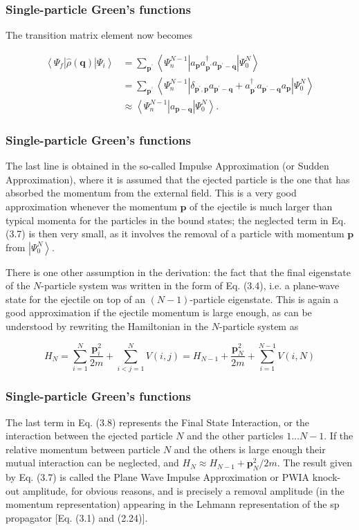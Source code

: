 \documentclass[compress]{beamer}
\begin{document}
\frame
{
\frametitle{Single-particle Green's functions}
\begin{small}
{\scriptsize
The transition matrix element now becomes

$$
\begin{aligned}
\left\langle\Psi_{f}|\hat{\rho}(\boldsymbol{q})| \Psi_{i}\right\rangle & =\sum_{\boldsymbol{p}^{\prime}}\left\langle\Psi_{n}^{N-1}\left|a_{\boldsymbol{p}} a_{\boldsymbol{p}^{\prime}}^{\dagger} a_{\boldsymbol{p}^{\prime}-\boldsymbol{q}}\right| \Psi_{0}^{N}\right\rangle \\
& =\sum_{\boldsymbol{p}^{\prime}}\left\langle\Psi_{n}^{N-1}\left|\delta_{\boldsymbol{p}^{\prime}, \boldsymbol{p}} a_{\boldsymbol{p}^{\prime}-\boldsymbol{q}}+a_{\boldsymbol{p}^{\prime}}^{\dagger} a_{\boldsymbol{p}^{\prime}-\boldsymbol{q}} a_{\boldsymbol{p}}\right| \Psi_{0}^{N}\right\rangle \\
& \approx\left\langle\Psi_{n}^{N-1}\left|a_{\boldsymbol{p}-\boldsymbol{q}}\right| \Psi_{0}^{N}\right\rangle .
\end{aligned}
$$

}
\end{small}
}
\frame
{
\frametitle{Single-particle Green's functions}
\begin{small}
{\scriptsize
The last line is obtained in the so-called Impulse Approximation (or Sudden Approximation), where it is assumed that the ejected particle is the one that
has absorbed the momentum from the external field. This is a very good approximation whenever the momentum $\boldsymbol{p}$ of the ejectile is much larger than typical momenta for the particles in the bound states; the neglected term in Eq. (3.7) is then very small, as it involves the removal of a particle with momentum $\boldsymbol{p}$ from $\left|\Psi_{0}^{N}\right\rangle$.

There is one other assumption in the derivation: the fact that the final eigenstate of the $N$-particle system was written in the form of Eq. (3.4), i.e. a plane-wave state for the ejectile on top of an $(N-1)$-particle eigenstate. This is again a good approximation if the ejectile momentum is large enough, as can be understood by rewriting the Hamiltonian in the $N$-particle system as

$$
H_{N}=\sum_{i=1}^{N} \frac{\boldsymbol{p}_{i}^{2}}{2 m}+\sum_{i<j=1}^{N} V(i, j)=H_{N-1}+\frac{\boldsymbol{p}_{N}^{2}}{2 m}+\sum_{i=1}^{N-1} V(i, N)
$$


}
\end{small}
}
\frame
{
\frametitle{Single-particle Green's functions}
\begin{small}
{\scriptsize
The last term in Eq. (3.8) represents the Final State Interaction, or
the interaction between the ejected particle $N$ and the other
particles $1 \ldots N-1$. If the relative momentum between particle
$N$ and the others is large enough their mutual interaction can be
neglected, and $H_{N} \approx H_{N-1}+\boldsymbol{p}_{N}^{2} / 2
m$. The result given by Eq. (3.7) is called the Plane Wave Impulse
Approximation or PWIA knock-out amplitude, for obvious reasons, and is
precisely a removal amplitude (in the momentum representation)
appearing in the Lehmann representation of the sp propagator
[Eq. (3.1) and (2.24)].

}
\end{small}
}
\end{document}
